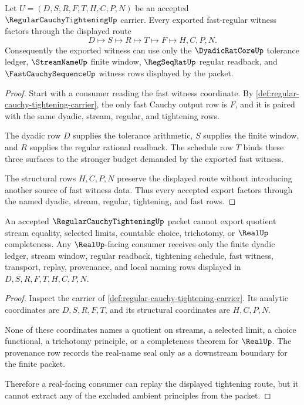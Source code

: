 \begin{theorem}
\label{thm:regular-cauchy-tightening-fast-regular-handoff}
Let $U=(D,S,R,F,T,H,C,P,N)$ be an accepted $\RegularCauchyTighteningUp$ carrier. Every exported fast-regular witness factors through the displayed route
$$
D \longmapsto S \longmapsto R \longmapsto T \longmapsto F \longmapsto H,C,P,N .
$$
Consequently the exported witness can use only the $\DyadicRatCoreUp$ tolerance ledger, $\StreamNameUp$ finite window, $\RegSeqRatUp$ regular readback, and $\FastCauchySequenceUp$ witness rows displayed by the packet.
\end{theorem}
\begin{proof}
Start with a consumer reading the fast witness coordinate. By \autoref{def:regular-cauchy-tightening-carrier}, the only fast Cauchy output row is $F$, and it is paired with the same dyadic, stream, regular, and tightening rows.

The dyadic row $D$ supplies the tolerance arithmetic, $S$ supplies the finite window, and $R$ supplies the regular rational readback. The schedule row $T$ binds these three surfaces to the stronger budget demanded by the exported fast witness.

The structural rows $H,C,P,N$ preserve the displayed route without introducing another source of fast witness data. Thus every accepted export factors through the named dyadic, stream, regular, tightening, and fast rows.
\end{proof}

\begin{theorem}
\label{thm:regular-cauchy-tightening-real-seal-boundary}
An accepted $\RegularCauchyTighteningUp$ packet cannot export quotient stream equality, selected limits, countable choice, trichotomy, or $\RealUp$ completeness. Any $\RealUp$-facing consumer receives only the finite dyadic ledger, stream window, regular readback, tightening schedule, fast witness, transport, replay, provenance, and local naming rows displayed in $D,S,R,F,T,H,C,P,N$.
\end{theorem}
\begin{proof}
Inspect the carrier of \autoref{def:regular-cauchy-tightening-carrier}. Its analytic coordinates are $D,S,R,F,T$, and its structural coordinates are $H,C,P,N$.

None of these coordinates names a quotient on streams, a selected limit, a choice functional, a trichotomy principle, or a completeness theorem for $\RealUp$. The provenance row records the real-name seal only as a downstream boundary for the finite packet.

Therefore a real-facing consumer can replay the displayed tightening route, but it cannot extract any of the excluded ambient principles from the packet.
\end{proof}

